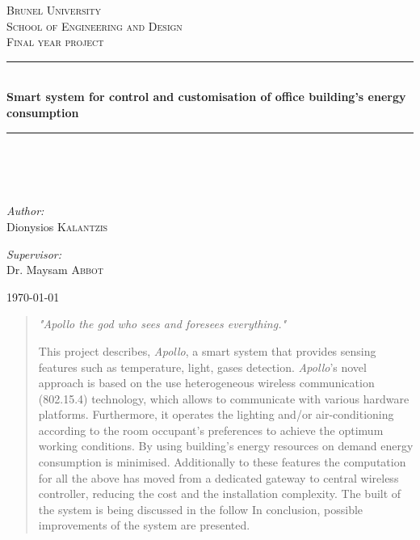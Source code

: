 \documentclass[12pt,a4paper,draft]{report}
\author{Student: Dionisios Kalantzis (SID:0733139) \\ Supervisor: Dr. Maysam Abbod}
\begin{document}
\onehalfspacing
\begin{titlepage}
\begin{center}
%
\textsc{\LARGE Brunel University}\\[1.5cm]
\textsc{\LARGE School of Engineering and Design}\\[1cm]
%
\textsc{\Large Final year project}\\[1cm]
\hrule
\hfill\\[0.5cm]
{ \huge \bfseries Smart system for control and customisation of office building's energy consumption}\\[0.5cm]
\hrule
\hfill\\[0.5cm]
\ \\
\hfill\\[0.2cm]
\begin{minipage}{0.4\textwidth}
\begin{flushleft} \large
\emph{Author:}\\
Dionysios \textsc{Kalantzis}
\end{flushleft}
\end{minipage}
\begin{minipage}{0.4\textwidth}
\begin{flushright} \large
\emph{Supervisor:} \\
Dr. Maysam \textsc{Abbot}
\end{flushright}
\end{minipage}
\vfill
{\large \today}
\end{center}
\end{titlepage}
\newpage
%
\newpage
\begin{abstract}
\begin{center}
\emph{"Apollo the god who sees and foresees everything."}
\end{center}
%
This project describes, \emph{Apollo}, a smart system that provides sensing features such as temperature, light, gases detection.
\emph{Apollo}'s novel approach is based on the use heterogeneous wireless communication (802.15.4) technology, which allows to communicate with various hardware platforms. 
Furthermore, it operates the lighting and/or air-conditioning according to the room occupant's preferences to achieve the optimum working conditions.
By using building's energy resources on demand energy consumption is minimised. 
Additionally to these features the computation for all the above has moved from a dedicated gateway to central wireless controller, reducing the cost and the installation complexity. 
The built of the system is being discussed in the follow
In conclusion, possible improvements of the system are presented.

\end{abstract}
\end{document}
